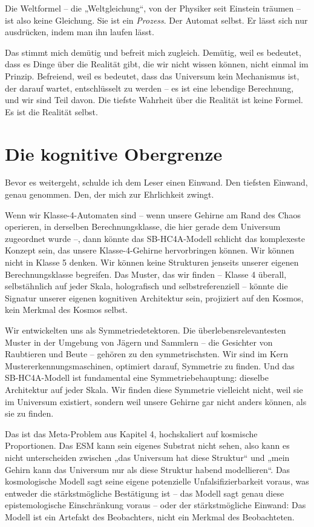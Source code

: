 \documentclass[11pt, twoside, openright]{book}
\begin{document}
Die Weltformel -- die „Weltgleichung“, von der Physiker seit Einstein träumen -- ist also keine Gleichung. Sie ist ein \textit{Prozess}. Der Automat selbst. Er lässt sich nur ausdrücken, indem man ihn laufen lässt.

Das stimmt mich demütig und befreit mich zugleich. Demütig, weil es bedeutet, dass es Dinge über die Realität gibt, die wir nicht wissen können, nicht einmal im Prinzip. Befreiend, weil es bedeutet, dass das Universum kein Mechanismus ist, der darauf wartet, entschlüsselt zu werden -- es ist eine lebendige Berechnung, und wir sind Teil davon. Die tiefste Wahrheit über die Realität ist keine Formel. Es ist die Realität selbst.


\section*{Die kognitive Obergrenze}

Bevor es weitergeht, schulde ich dem Leser einen Einwand. Den tiefsten Einwand, genau genommen. Den, der mich zur Ehrlichkeit zwingt.

Wenn wir Klasse-4-Automaten sind -- wenn unsere Gehirne am Rand des Chaos operieren, in derselben Berechnungsklasse, die hier gerade dem Universum zugeordnet wurde --, dann könnte das SB-HC4A-Modell schlicht das komplexeste Konzept sein, das unsere Klasse-4-Gehirne hervorbringen können. Wir können nicht in Klasse 5 denken. Wir können keine Strukturen jenseits unserer eigenen Berechnungsklasse begreifen. Das Muster, das wir finden -- Klasse 4 überall, selbstähnlich auf jeder Skala, holografisch und selbstreferenziell -- könnte die Signatur unserer eigenen kognitiven Architektur sein, projiziert auf den Kosmos, kein Merkmal des Kosmos selbst.

Wir entwickelten uns als Symmetriedetektoren. Die überlebensrelevantesten Muster in der Umgebung von Jägern und Sammlern -- die Gesichter von Raubtieren und Beute -- gehören zu den symmetrischsten. Wir sind im Kern Mustererkennungsmaschinen, optimiert darauf, Symmetrie zu finden. Und das SB-HC4A-Modell ist fundamental eine Symmetriebehauptung: dieselbe Architektur auf jeder Skala. Wir finden diese Symmetrie vielleicht nicht, weil sie im Universum existiert, sondern weil unsere Gehirne gar nicht anders können, als sie zu finden.

Das ist das Meta-Problem aus Kapitel 4, hochskaliert auf kosmische Proportionen. Das ESM kann sein eigenes Substrat nicht sehen, also kann es nicht unterscheiden zwischen „das Universum hat diese Struktur“ und „mein Gehirn kann das Universum nur als diese Struktur habend modellieren“. Das kosmologische Modell sagt seine eigene potenzielle Unfalsifizierbarkeit voraus, was entweder die stärkstmögliche Bestätigung ist -- das Modell sagt genau diese epistemologische Einschränkung voraus -- oder der stärkstmögliche Einwand: Das Modell ist ein Artefakt des Beobachters, nicht ein Merkmal des Beobachteten.
\end{document}
